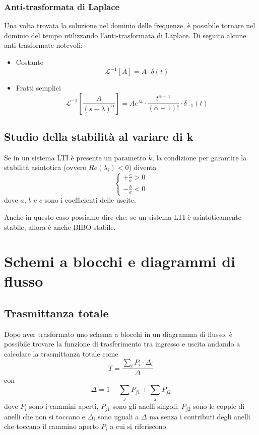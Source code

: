 \documentclass[a4paper,oneside,titlepage]{book}
\begin{document}
\subsection{Anti-trasformata di Laplace}
Una volta trovata la soluzione nel dominio delle frequenze, è possibile tornare nel dominio del tempo utilizzando l'anti-trasformata di Laplace. Di seguito alcune anti-trasformate notevoli:
\begin{itemize}
\item Costante
\[ \mathcal{L}^{-1} \left[ A \right] = A \cdot \delta(t) \]

\item Fratti semplici
\[ \mathcal{L}^{-1} \left[ \frac{A}{(s - \lambda)^\alpha} \right] = A e^{\lambda t} \cdot \frac{t^{\alpha -1}}{(\alpha -1)!} \cdot \delta_{-1}(t) \]
\end{itemize}


\section{Studio della stabilità al variare di k}
Se in un sistema LTI è presente un parametro $k$, la condizione per garantire la stabilità asintotica (ovvero $Re(\lambda_i)<0$) diventa
\[ \begin{cases}
+ \frac{c}{a} > 0 \\
- \frac{b}{a} < 0
\end{cases} \]
dove $a$, $b$ e $c$ sono i coefficienti delle uscite.

Anche in questo caso possiamo dire che: se un sistema LTI è asintoticamente stabile, allora è anche BIBO stabile.


\chapter{Schemi a blocchi e diagrammi di flusso}

\section{Trasmittanza totale}
Dopo aver trasformato uno schema a blocchi in un diagramma di flusso, è possibile trovare la funzione di trasferimento tra ingresso e uscita andando a calcolare la trasmittanza totale come
\[ T = \frac{\sum_i P_i \cdot \Delta_i}{\Delta} \]
con
\[ \Delta = 1 - \sum_j P_{j1} + \sum_j P_{j2} \]
dove $P_i$ sono i cammini aperti, $P_{j1}$ sono gli anelli singoli, $P_{j2}$ sono le coppie di anelli che non si toccano e $\Delta_i$ sono uguali a $\Delta$ ma senza i contributi degli anelli che toccano il cammino aperto $P_i$ a cui si riferiscono.
\end{document}
